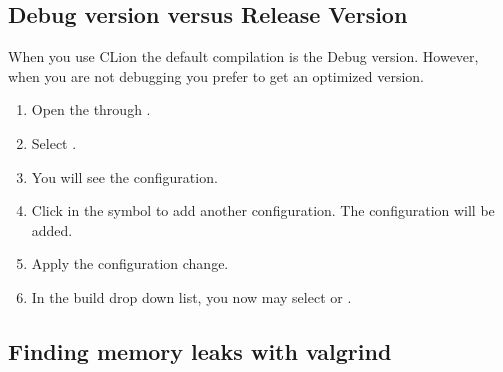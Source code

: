 \subsection{Debug version versus Release Version}

When you use CLion the default compilation is the Debug version.
However, when you are not debugging you prefer to get an optimized  version.

\begin{enumerate}

\item
Open the  through .

\item
Select .

\item 
You will see the  configuration.

\item 
Click in the \textmark{+} symbol to add another configuration. The  configuration
will be added.

\item
Apply the configuration change.

\item
In the build drop down list, you now may select  or .

\end{enumerate}

\subsection{Finding memory leaks with valgrind}

